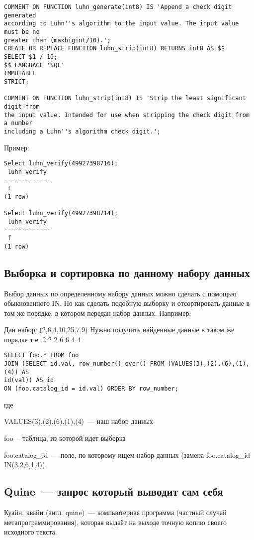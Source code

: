 \begin{lstlisting}[label=lst:snippets10,title=snippets/luhn\_algorithm.sql]
COMMENT ON FUNCTION luhn_generate(int8) IS 'Append a check digit generated
according to Luhn''s algorithm to the input value. The input value must be no
greater than (maxbigint/10).';
CREATE OR REPLACE FUNCTION luhn_strip(int8) RETURNS int8 AS $$
SELECT $1 / 10;
$$ LANGUAGE 'SQL'
IMMUTABLE
STRICT;

COMMENT ON FUNCTION luhn_strip(int8) IS 'Strip the least significant digit from
the input value. Intended for use when stripping the check digit from a number
including a Luhn''s algorithm check digit.';
\end{lstlisting}

Пример:
\begin{lstlisting}[label=lst:snippets11,caption=Алгоритм Луна. Пример]
Select luhn_verify(49927398716);
 luhn_verify
-------------
 t
(1 row)

Select luhn_verify(49927398714);
 luhn_verify
-------------
 f
(1 row)

\end{lstlisting}

\subsection{Выборка и сортировка по данному набору данных}
Выбор данных по определенному набору данных можно сделать с помощью обыкновенного IN. Но как сделать подобную выборку и отсортировать
данные в том же порядке, в котором передан набор данных. Например:

Дан набор: (2,6,4,10,25,7,9)
Нужно получить найденные данные в таком же порядке т.е. 2 2 2 6 6 4 4

\begin{lstlisting}[label=lst:snippets12,title=snippets/order\_like\_in.sql]
SELECT foo.* FROM foo
JOIN (SELECT id.val, row_number() over() FROM (VALUES(3),(2),(6),(1),(4)) AS
id(val)) AS id
ON (foo.catalog_id = id.val) ORDER BY row_number;
\end{lstlisting}

где

VALUES(3),(2),(6),(1),(4)~--- наш набор данных

foo~-- таблица, из которой идет выборка

foo.catalog\_id~--- поле, по которому ищем набор данных (замена foo.catalog\_id IN(3,2,6,1,4))

\subsection{Quine~--- запрос который выводит сам себя}
Куайн, квайн (англ. quine)~--- компьютерная программа (частный случай метапрограммирования),
которая выдаёт на выходе точную копию своего исходного текста.

